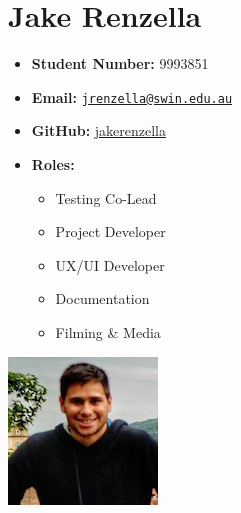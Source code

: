 \documentclass[a4paper,12pt]{article}
\providecommand{\tightlist}{%
  \setlength{\itemsep}{0pt}\setlength{\parskip}{0pt}}
\begin{document}
\begin{minipage}{0.7\textwidth}
\section{Jake Renzella}\label{jake-renzella}
\begin{itemize}[label={}]
\tightlist
\item
  \textbf{Student Number:} 9993851
\item
  \textbf{Email:}
  \href{mailto:jrenzella@swin.edu.au}{\nolinkurl{jrenzella@swin.edu.au}}
\item
  \textbf{GitHub:}
  \href{http://www.github.com/jakerenzella}{jakerenzella}
\item
  \textbf{Roles:}
  \begin{itemize}
    \item Testing Co-Lead
    \item Project Developer
    \item UX/UI Developer
    \item Documentation
    \item Filming \& Media
  \end{itemize}
\end{itemize}
\end{minipage}%
\begin{minipage}{0.3\textwidth}
\includegraphics{./imgs/jake.png}
\end{minipage}

\newpage
\end{document}
